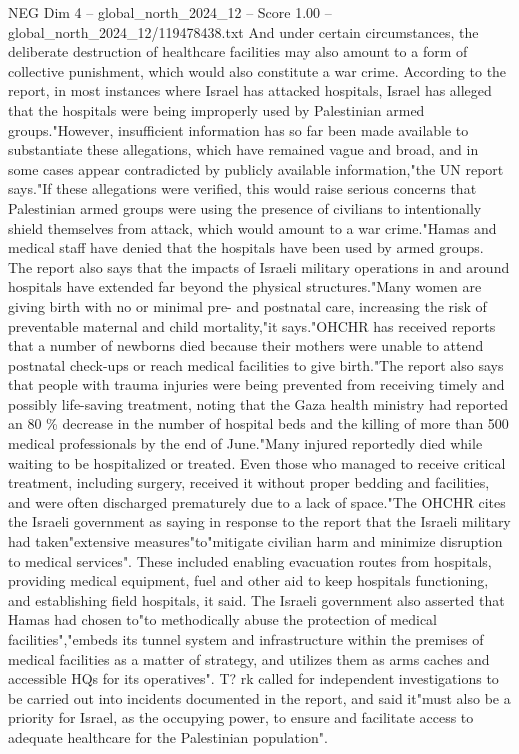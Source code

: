 \begin{textsample}{NEG Dim 4 – global\_north\_2024\_12 – Score 1.00 – global\_north\_2024\_12/119478438.txt}
And under certain circumstances, the deliberate destruction of healthcare facilities may also amount to a form of collective punishment, which would also constitute a war crime.
According to the report, in most instances where Israel has attacked hospitals, Israel has alleged that the hospitals were being improperly used by Palestinian armed groups."However, insufficient information has so far been made available to substantiate these allegations, which have remained vague and broad, and in some cases appear contradicted by publicly available information,"the UN report says."If these allegations were verified, this would raise serious concerns that Palestinian armed groups were using the presence of civilians to intentionally shield themselves from attack, which would amount to a war crime."Hamas and medical staff have denied that the hospitals have been used by armed groups.
The report also says that the impacts of Israeli military operations in and around hospitals have extended far beyond the physical structures."Many women are giving birth with no or minimal pre- and postnatal care, increasing the risk of preventable maternal and child mortality,"it says."OHCHR has received reports that a number of newborns died because their mothers were unable to attend postnatal check-ups or reach medical facilities to give birth."The report also says that people with trauma injuries were being prevented from receiving timely and possibly life-saving treatment, noting that the Gaza health ministry had reported an 80 \% decrease in the number of hospital beds and the killing of more than 500 medical professionals by the end of June."Many injured reportedly died while waiting to be hospitalized or treated.
Even those who managed to receive critical treatment, including surgery, received it without proper bedding and facilities, and were often discharged prematurely due to a lack of space."The OHCHR cites the Israeli government as saying in response to the report that the Israeli military had taken"extensive measures"to"mitigate civilian harm and minimize disruption to medical services".
These included enabling evacuation routes from hospitals, providing medical equipment, fuel and other aid to keep hospitals functioning, and establishing field hospitals, it said.
The Israeli government also asserted that Hamas had chosen to"to methodically abuse the protection of medical facilities","embeds its tunnel system and infrastructure within the premises of medical facilities as a matter of strategy, and utilizes them as arms caches and accessible HQs for its operatives".
T? rk called for independent investigations to be carried out into incidents documented in the report, and said it"must also be a priority for Israel, as the occupying power, to ensure and facilitate access to adequate healthcare for the Palestinian population".

\end{textsample}
